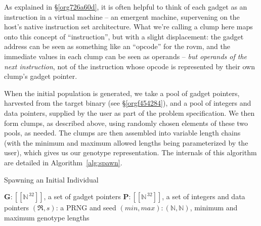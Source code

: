 \documentclass[12pt,glossary]{dalthesis}
\begin{document}
As explained in \S \ref{org726a60d}, it is often helpful to think of
each gadget as an instruction in a virtual machine -- an emergent machine,
supervening on the host's native instruction set architecture. What we're
calling a clump here maps onto this concept of ``instruction'', but with a
slight displacement: the gadget address can be seen as something
like an ``opcode'' for the \gls{rovm}, and the immediate values in each clump
can be seen as operands -- \emph{but operands of the next instruction}, not of
the instruction whose opcode is represented by their own clump's gadget
pointer.

When the initial population is generated, we take a pool of gadget pointers, 
harvested from the target binary (see \S \ref{orgf454284}), and a
pool of integers and data pointers, supplied by the user as part of the problem
specification. We then form clumps, as described above, using randomly chosen
elements of these two pools, as needed. The clumps are then assembled into 
variable length chains (with the minimum and maximum allowed lengths being
parameterized by the user), which gives us our genotype representation. The
internals of this algorithm are detailed in Algorithm~\ref{alg:spawn}.

\begin{algorithm}
\caption{Spawning an Initial Individual}
\label{alg:spawn}
\begin{algorithmic}[1]
\REQUIRE $\mathbf{G}: [\![\mathbb{N}^{\,32}]\!]$, a set of gadget pointers
\REQUIRE $\mathbf{P}: [\![\mathbb{N}^{\,32}]\!]$, a set of integers and data pointers
\REQUIRE $(\mathfrak{R}, s)$: a PRNG and seed
\REQUIRE $(min, max): (\mathbb{N}, \mathbb{N})$, minimum and maximum genotype lengths
 
    \ENDFOR
\ENDFOR
\RETURN {$\Gamma$}
\end{algorithmic}
\end{algorithm}
\end{document}
